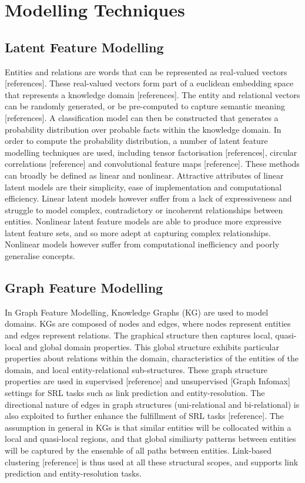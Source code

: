 
\section{Modelling Techniques} %

\subsection{Latent Feature Modelling} %
Entities and relations are words that can be represented as real-valued vectors [references]. These real-valued vectors form part of a euclidean embedding space that represents a knowledge domain [references]. The entity and relational vectors can be randomly generated, or be pre-computed to capture semantic meaning [references]. A classification model can then be constructed that generates a probability distribution over probable facts within the knowledge domain. In order to compute the probability distribution, a number of latent feature modelling techniques are used, including tensor factorisation [references], circular correlations [reference] and convolutional feature maps [reference]. These methods can broadly be defined as linear and nonlinear. Attractive attributes of linear latent models are their simplicity, ease of implementation and computational efficiency. Linear latent models however suffer from a lack of expressiveness and struggle to model complex, contradictory or incoherent relationships between entities. Nonlinear latent feature models are able to produce more expressive latent feature sets, and so more adept at capturing complex relationships. Nonlinear models however suffer from computational inefficiency and poorly generalise concepts. \newline
\subsection{Graph Feature Modelling} %
In Graph Feature Modelling, Knowledge Graphs (KG) are used to model domains. KGs are composed of nodes and edges, where nodes represent entities and edges represent relations. The graphical structure then captures local, quasi-local and global domain properties. This global structure exhibits particular properties about relations within the domain, characteristics of the entities of the domain, and local entity-relational sub-structures. These graph structure properties are used in supervised [reference] and unsupervised [Graph Infomax] settings for SRL tasks such as link prediction and entity-resolution. The directional nature of edges in graph structures (uni-relational and bi-relational) is also exploited to further enhance the fulfillment of SRL tasks [reference]. The assumption in general in KGs is that similar entities will be collocated within a local and quasi-local regions, and that global similiarty patterns between entities will be captured by the ensemble of all paths between entities. Link-based clustering [reference] is thus used at all these structural scopes, and supports link prediction and entity-resolution tasks. 
